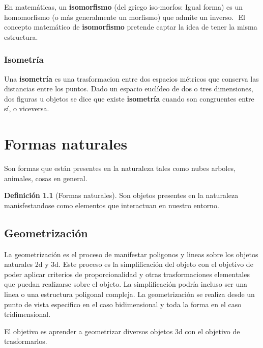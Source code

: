 \documentclass[16pt,]{krantz}
\theoremstyle{definition}
\newtheorem{definition}{Definición}[chapter]
\theoremstyle{definition}
\theoremstyle{definition}
\theoremstyle{definition}
\theoremstyle{remark}
\begin{document}
En matemáticas, un \textbf{isomorfismo} (del griego iso-morfos: Igual forma) es un homomorfismo (o más generalmente un morfismo) que admite un inverso. ​ El concepto matemático de \textbf{isomorfismo} pretende captar la idea de tener la misma estructura.

\hypertarget{isometruxeda}{%
\subsection{Isometría}\label{isometruxeda}}

Una \textbf{isometría} es una trasformacion entre dos espacios métricos que conserva las distancias entre los puntos. Dado un espacio euclídeo de dos o tres dimensiones, dos figuras u objetos se dice que existe \textbf{isometría} cuando son congruentes entre sí, o viceversa.

\hypertarget{formas-naturales}{%
\chapter{Formas naturales}\label{formas-naturales}}

Son formas que están presentes en la naturaleza tales como nubes arboles, animales, cosas en general.

\begin{definition}[Formas naturales]
\protect\hypertarget{def:formasnaturales}{}{\label{def:formasnaturales} {} }Son objetos presentes en la naturaleza manisfestandose como elementos que interactuan en nuestro entorno.
\end{definition}

\hypertarget{geometrizaciuxf3n}{%
\section{Geometrización}\label{geometrizaciuxf3n}}

La geometrización es el proceso de manifestar poligonos y lineas sobre los objetos naturales 2d y 3d. Este proceso es la simplificación del objeto con el objetivo de poder aplicar criterios de proporcionalidad y otras trasformaciones elementales que puedan realizarse sobre el objeto. La simplificación podría incluso ser una linea o una estructura poligonal compleja. La geometrización se realiza desde un punto de vista especifico en el caso bidimensional y toda la forma en el caso tridimensional.

El objetivo es aprender a geometrizar diversos objetos 3d con el objetivo de trasformarlos.
\end{document}
